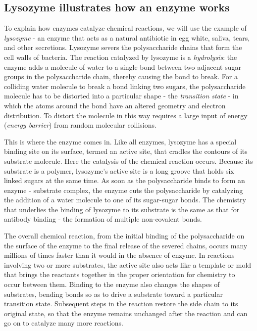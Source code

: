 \subsection{Lysozyme illustrates how an enzyme works}

To explain how enzymes catalyze chemical reactions, we will use the
example of \textit{lysozyme} - an enzyme that acts as a natural antibiotic in egg
white, saliva, tears, and other secretions. Lysozyme severs the polysaccharide
chains that form the cell walls of bacteria.
The reaction catalyzed by lysozyme is a \textit{hydrolysis}: the enzyme adds a
molecule of water to a single bond between two adjacent sugar groups in
the polysaccharide chain, thereby causing the bond to break.
For a colliding water molecule to break a bond linking two sugars, the
polysaccharide molecule has to be distorted into a particular shape - the
\textit{transition state} - in which the atoms around the bond have an altered
geometry and electron distribution. To distort the molecule in this way
requires a large input of energy (\textit{energy barrier}) from random molecular collisions.

This is where the enzyme comes in. Like all enzymes, lysozyme has a
special binding site on its surface, termed an active site, that cradles the
contours of its substrate molecule. Here the catalysis of the chemical reaction
occurs. Because its substrate is a polymer, lysozyme’s active site is a
long groove that holds six linked sugars at the same time. As soon as the
polysaccharide binds to form an enzyme - substrate complex, the enzyme
cuts the polysaccharide by catalyzing the addition of a water molecule to
one of its sugar-sugar bonds.
The chemistry that underlies the binding of lysozyme to its substrate is
the same as that for antibody binding - the formation of multiple non-covalent bonds.

The overall chemical reaction, from the initial binding of the polysaccharide
on the surface of the enzyme to the final release of the severed
chains, occurs many millions of times faster than it would in the absence
of enzyme.
In reactions involving two or more
substrates, the active site also acts like a template or mold that brings
the reactants together in the proper orientation for chemistry to occur between them.
Binding to the enzyme also changes the shapes of substrates,
bending bonds so as to drive a substrate toward a particular
transition state. Subsequent
steps in the reaction restore the side chain to its original state, so that the
enzyme remains unchanged after the reaction and can go on to catalyze
many more reactions.

